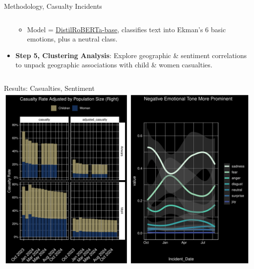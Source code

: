 \documentclass[
  ignorenonframetext,
]{beamer}
\providecommand{\tightlist}{%
  \setlength{\itemsep}{0pt}\setlength{\parskip}{0pt}}\usepackage{longtable,booktabs,array}
\begin{document}
\begin{frame}{Methodology, Casualty Incidents}
\begin{columns}[T]
\begin{column}{0.4\textwidth}
\begin{itemize}
  \begin{itemize}
  \tightlist
  \item
    Model =
    \href{https://huggingface.co/j-hartmann/emotion-english-distilroberta-base}{DistilRoBERTa-base},
    classifies text into Ekman's 6 basic emotions, plus a neutral class.
  \end{itemize}
\item
  \textbf{Step 5, Clustering Analysis}: Explore geographic \& sentiment
  correlations to unpack geographic associations with child \& women
  casualties.
\end{itemize}
\end{column}
\end{columns}
\end{frame}

\begin{frame}{Results: Casualties, Sentiment}
\label{results-casualties-sentiment}
\includegraphics{airwars_project_slides_files/figure-beamer/unnamed-chunk-3-1.pdf}
\end{frame}
\end{document}
